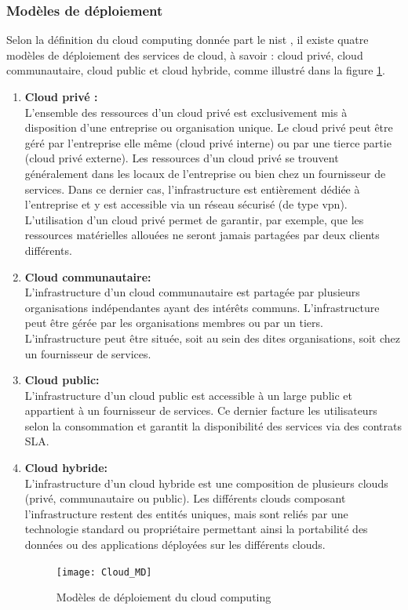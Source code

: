\subsubsection { Modèles de déploiement}  

Selon la définition du cloud computing  donnée part le \ac{nist} \parencite{Mell}, il existe quatre modèles de déploiement des services de cloud, à savoir : cloud privé, cloud communautaire, cloud public et cloud hybride, comme illustré dans la figure \ref{fig:cloudmd}.
\begin{enumerate}
	\item \textbf{Cloud privé :}\\
	 L’ensemble des ressources d’un cloud privé est exclusivement mis à disposition d’une entreprise ou organisation unique. Le cloud privé peut être géré par l’entreprise elle même (cloud privé interne) ou par une tierce partie (cloud privé externe). Les ressources d’un cloud privé se trouvent généralement dans les locaux de l’entreprise ou bien chez un fournisseur de services. Dans ce dernier cas, l’infrastructure est entièrement dédiée à l’entreprise et y est accessible via un réseau sécurisé (de type \ac{vpn}).  L’utilisation d’un cloud privé permet de 	garantir, par exemple, que les ressources matérielles allouées ne seront jamais partagées par deux clients différents. 
	
	\item \textbf{Cloud communautaire:}\\
	 L’infrastructure d’un cloud communautaire est partagée par plusieurs organisations indépendantes ayant des intérêts communs. L’infrastructure peut être gérée par les organisations membres ou par un tiers. L’infrastructure peut être située, soit au sein des dites organisations, soit chez un fournisseur de services. 
	\item \textbf{Cloud public:}\\
	L’infrastructure d’un cloud public est accessible à un large public et appartient à un fournisseur de services. Ce dernier facture les utilisateurs selon la consommation et garantit la disponibilité des services via des contrats SLA. 
	\item \textbf{Cloud hybride:}\\
	 L’infrastructure d’un cloud hybride est une composition de plusieurs clouds (privé, communautaire ou public). Les différents clouds composant l’infrastructure restent des entités uniques, mais sont reliés par une technologie standard ou propriétaire permettant ainsi la portabilité des données ou des applications déployées sur les différents clouds.  

\begin{figure}[H]
	\centering
	\texttt{[image: Cloud\_MD]}
	\caption{Modèles de déploiement du cloud computing }
	\label{fig:cloudmd}
\end{figure}
\end{enumerate}
